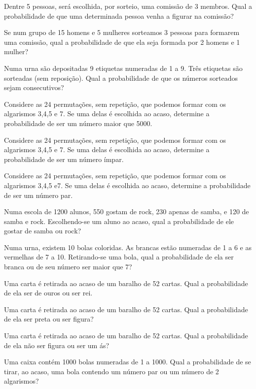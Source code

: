 		\item Dentre 5 pessoas, será escolhida, por sorteio, uma comissão de 3 membros.  Qual  a  probabilidade  de  que  uma  determinada  pessoa venha a figurar na comissão? 
		\item Se  num  grupo  de  15  homens  e  5  mulheres  sorteamos  3  pessoas para  formarem  uma  comissão,  qual  a  probabilidade  de  que  ela seja formada por 2 homens e 1 mulher? 
		\item Numa urna são depositadas 9 etiquetas numeradas de 1 a 9. Três etiquetas são sorteadas (sem reposição). Qual a probabilidade de que os números sorteados sejam consecutivos? 
		\item Considere   as   24   permutações,   sem   repetição, que podemos formar  com  os  algarismos  3,4,5  e 7.  Se  uma  delas  é  escolhida  ao acaso,  determine  a  probabilidade  de  ser  um  número  maior  que 5000. 
		\item Considere   as   24   permutações,   sem   repetição, que podemos formar  com  os  algarismos  3,4,5  e 7.  Se  uma  delas  é  escolhida  ao acaso, determine a probabilidade de ser um número ímpar. 
		\item Considere   as   24   permutações,   sem   repetição, que podemos formar  com  os  algarismos  3,4,5  e7.  Se  uma  delas  é  escolhida  ao acaso, determine a probabilidade de ser um número par. 
		\item Numa escola de 1200 alunos, 550 gostam de rock, 230 apenas de samba, e 120 de samba e rock. Escolhendo-se um aluno ao acaso, qual a probabilidade de ele gostar de samba ou rock?
		\item Numa   urna,   existem   10   bolas   coloridas.   As   brancas   estão numeradas  de  1  a  6  e  as  vermelhas  de  7  a  10.  Retirando-se  uma bola, qual a probabilidade de ela ser branca ou de seu número ser maior que 7? 
		\item Uma carta é retirada ao acaso de um baralho de 52 cartas. Qual a probabilidade de ela ser de ouros ou ser rei. 
		\item Uma carta é retirada ao acaso de um baralho de 52 cartas. Qual a probabilidade de ela ser preta ou ser figura? 
		\item Uma carta é retirada ao acaso de um baralho de 52 cartas. Qual a probabilidade de ela não ser figura ou ser um ás? 
		\item Uma  caixa  contém  1000  bolas  numeradas  de  1 a  1000.  Qual  a probabilidade   de   se   tirar,   ao   acaso,   uma   bola   contendo   um número par ou um número de 2 algarismos? 
